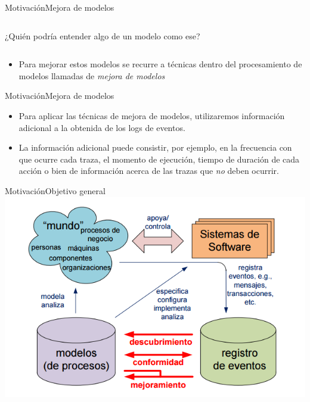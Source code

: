 \documentclass[spanish,pdf]{beamer}
\begin{document}
\begin{frame}{Motivación}{Mejora de modelos}
\begin{columns}
      ¿Quién podría entender algo de un modelo como ese?
  \end{columns}
  \begin{itemize}
    \item<6-> Para mejorar estos modelos se recurre a técnicas dentro del procesamiento de modelos
              llamadas de \textit{mejora de modelos}
  \end{itemize}
\end{frame}

\begin{frame}{Motivación}{Mejora de modelos}
   \begin{itemize}
      \setlength\itemsep{0.4cm}
      \item<2-> Para aplicar las técnicas de mejora de modelos, utilizaremos información adicional a la
                obtenida de los logs de eventos.
      \item<3-> La información adicional puede consistir, por ejemplo, en la frecuencia con que ocurre cada traza, el 
          momento de ejecución, tiempo de duración de cada acción o bien de información
          acerca de las trazas que \textit{no} deben ocurrir.
    \end{itemize}
\end{frame}

\begin{frame}{Motivación}{Objetivo general}
  \centering
  \includegraphics[width=0.95\linewidth]{img/pmcycle.png}
\end{frame}
\end{document}
